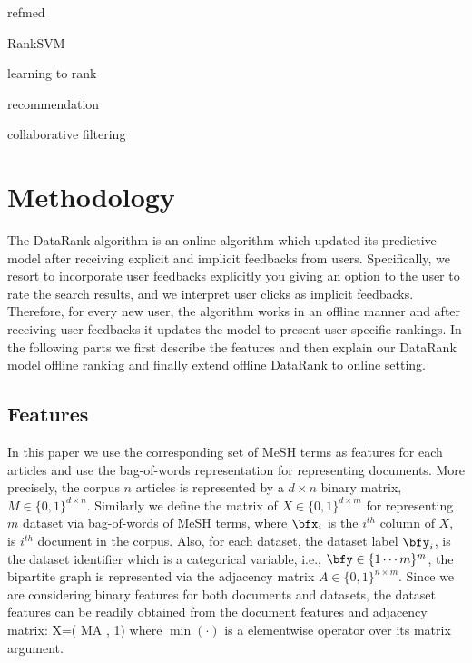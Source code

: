 \documentclass[twoside,11pt]{article}
\begin{document}
refmed \cite{refmed}

RankSVM \citep{svm-rank-j}

learning to rank \cite{yahoo-rank-challange}

recommendation 
\cite{recommender-survey}

collaborative filtering
\cite{cff-survey}

\section{Methodology} \label{sec:methodology}
The DataRank algorithm is an online algorithm which updated its predictive model after receiving explicit and implicit feedbacks from users. Specifically, we resort to incorporate user feedbacks explicitly you giving an option to the user to rate the search results, and we interpret user clicks as implicit feedbacks. Therefore, for every new user, the algorithm works in an offline manner and after receiving user feedbacks it updates the model to present user specific rankings. In the following parts we first describe the features and then explain our DataRank model offline ranking and finally extend offline DataRank to online setting.

\subsection{Features}
In this paper we use the corresponding set of MeSH terms as features for each articles and use the bag-of-words representation for representing documents. More precisely, the corpus $n$ articles is represented by a $d \times n$ binary matrix, $M\in \{0,1\}^{d\times n}$. Similarly we define the matrix of $X\in \{0,1\}^{d\times m}$ for representing $m$ dataset via bag-of-words of MeSH terms, where $\bfx_i$ is the $i^{th}$ column of $X$, is $i^{th}$ document in the corpus. Also, for each dataset, the dataset  label $\bfy_i$, is the dataset identifier which is a categorical variable, i.e., $\bfy \in \{{1\cdots m}\}^m$, the bipartite graph is represented via the adjacency matrix $A\in \{0,1\}^{n\times m}$. Since we are considering binary features for both documents and datasets, the dataset features can be readily obtained from the document features and adjacency matrix:
\beq
X=\min( MA , 1)
\eeq
where $\min(\cdot)$ is a elementwise operator over its matrix argument.
\end{document}
